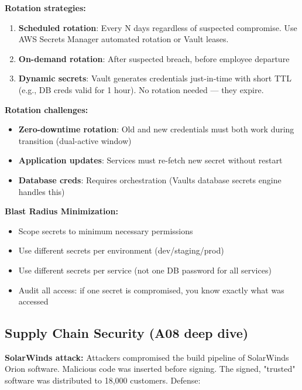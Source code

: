 \documentclass[11pt]{article}
\providecommand{\tightlist}{\setlength{\itemsep}{1pt}\setlength{\parskip}{0pt}}
\begin{document}
\textbf{Rotation strategies:}

\begin{enumerate}
\def\labelenumi{\arabic{enumi}.}
\tightlist
\item
  \textbf{Scheduled rotation}: Every N days regardless of suspected compromise. Use AWS Secrets Manager automated rotation or Vault leases.
\item
  \textbf{On-demand rotation}: After suspected breach, before employee departure
\item
  \textbf{Dynamic secrets}: Vault generates credentials just-in-time with short TTL (e.g., DB creds valid for 1 hour). No rotation needed --- they expire.
\end{enumerate}

\textbf{Rotation challenges:}

\begin{itemize}
\tightlist
\item
  \textbf{Zero-downtime rotation}: Old and new credentials must both work during transition (dual-active window)
\item
  \textbf{Application updates}: Services must re-fetch new secret without restart
\item
  \textbf{Database creds}: Requires orchestration (Vault\textquotesingle s database secrets engine handles this)
\end{itemize}

\textbf{Blast Radius Minimization:}

\begin{itemize}
\tightlist
\item
  Scope secrets to minimum necessary permissions
\item
  Use different secrets per environment (dev/staging/prod)
\item
  Use different secrets per service (not one DB password for all services)
\item
  Audit all access: if one secret is compromised, you know exactly what was accessed
\end{itemize}

\subsection{Supply Chain Security (A08 deep dive)}\label{supply-chain-security-a08-deep-dive}

\textbf{SolarWinds attack:} Attackers compromised the build pipeline of SolarWinds Orion software. Malicious code was inserted before signing. The signed, "trusted" software was distributed to 18,000 customers. Defense:
\end{document}
